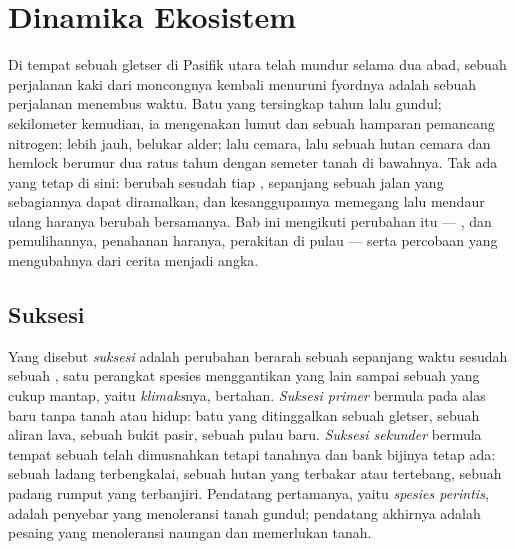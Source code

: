 \chapter{Dinamika Ekosistem}\label{ch:b1:ecosystem-dynamics}

Di tempat sebuah gletser di Pasifik utara telah mundur selama dua
abad, sebuah perjalanan kaki dari moncongnya kembali menuruni fyordnya
adalah sebuah perjalanan menembus waktu. Batu yang tersingkap tahun
lalu gundul; sekilometer kemudian, ia mengenakan lumut dan sebuah
hamparan pemancang nitrogen; lebih jauh, belukar alder; lalu cemara,
lalu sebuah hutan cemara dan hemlock berumur dua ratus tahun dengan
semeter tanah di bawahnya. Tak ada yang tetap di sini: 
berubah sesudah tiap , sepanjang sebuah jalan yang sebagiannya
dapat diramalkan, dan kesanggupannya memegang lalu mendaur ulang
haranya berubah bersamanya. Bab ini mengikuti perubahan itu ---
,  dan pemulihannya, penahanan haranya, perakitan
 di pulau --- serta percobaan yang mengubahnya dari cerita
menjadi angka.

\section{Suksesi}

\begin{definition}\label{def:b1:ecosystem-dynamics:succession}
Yang disebut \emph{suksesi} adalah perubahan berarah sebuah 
sepanjang waktu sesudah sebuah , satu perangkat spesies
menggantikan yang lain sampai sebuah  yang cukup mantap,
yaitu \emph{klimaks}nya, bertahan. \emph{Suksesi primer} bermula pada
alas baru tanpa tanah atau  hidup: batu yang ditinggalkan
sebuah gletser, sebuah aliran lava, sebuah bukit pasir, sebuah pulau
baru. \emph{Suksesi sekunder} bermula tempat sebuah  telah
dimusnahkan tetapi tanahnya dan bank bijinya tetap ada: sebuah ladang
terbengkalai, sebuah hutan yang terbakar atau tertebang, sebuah padang
rumput yang terbanjiri. Pendatang pertamanya, yaitu \emph{spesies
perintis}, adalah penyebar yang menoleransi tanah gundul; pendatang
akhirnya adalah pesaing yang menoleransi naungan dan memerlukan tanah.
\end{definition}

